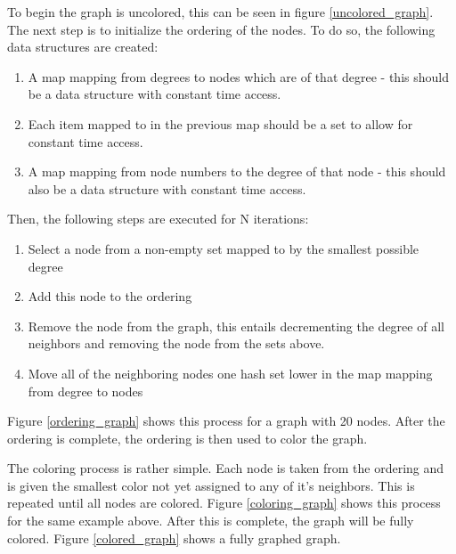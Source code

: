 \documentclass{article}
\begin{document}
    To begin the graph is uncolored, this can be seen in figure \ref{uncolored_graph}.
    The next step is to initialize the ordering of the nodes.
    To do so, the following data structures are created:
    \begin{enumerate}
      \item A map mapping from degrees to nodes which are of that degree - this should be a data structure with constant time access.
      \item Each item mapped to in the previous map should be a set to allow for constant time access.
      \item A map mapping from node numbers to the degree of that node - this should also be a data structure with constant time access.
    \end{enumerate}
    Then, the following steps are executed for N iterations:
    \begin{enumerate}
      \item Select a node from a non-empty set mapped to by the smallest possible degree
      \item Add this node to the ordering
      \item Remove the node from the graph, this entails decrementing the degree of all neighbors and removing the node from the sets above.
      \item Move all of the neighboring nodes one hash set lower in the map mapping from degree to nodes
    \end{enumerate}
    Figure \ref{ordering_graph} shows this process for a graph with 20 nodes.
    After the ordering is complete, the ordering is then used to color the graph.

    The coloring process is rather simple.
    Each node is taken from the ordering and is given the smallest color not yet assigned to any of it's neighbors.
    This is repeated until all nodes are colored.
    Figure \ref{coloring_graph} shows this process for the same example above.
    After this is complete, the graph will be fully colored.
    Figure \ref{colored_graph} shows a fully graphed graph.
\end{document}
